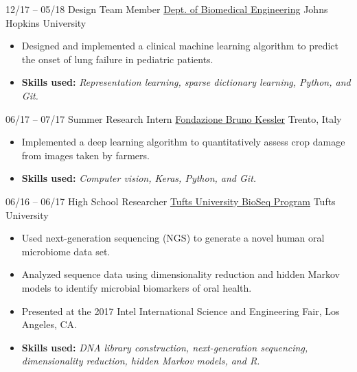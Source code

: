 \cventry
{12/17 -- 05/18}
{Design Team Member}
{\href{https://cbid.bme.jhu.edu/academics/undergraduate-studies/}{Dept. of Biomedical Engineering}}
{Johns Hopkins University}
{}
{
\begin{itemize}
    \item Designed and implemented a clinical machine learning algorithm to predict the onset of lung failure in pediatric patients.
    \item \textbf{Skills used:} \textit{Representation learning, sparse dictionary learning, Python, and Git.}
\end{itemize}{}
}

\cventry
{06/17 -- 07/17}
{Summer Research Intern}
{\href{https://webvalley.fbk.eu}{Fondazione Bruno Kessler}}
{Trento, Italy}
{}
{
\begin{itemize}
    \item Implemented a deep learning algorithm to quantitatively assess crop damage from images taken by farmers.
    \item \textbf{Skills used:} \textit{Computer vision, Keras, Python, and Git.}
\end{itemize}{}
}

\cventry
{06/16 -- 06/17}
{High School Researcher}
{\href{http://ase.tufts.edu/chemistry/walt/sepa/index.html}{Tufts University BioSeq Program}}
{Tufts University}
{}
{
\begin{itemize}
    \item Used next-generation sequencing (NGS) to generate a novel human oral microbiome data set.
    \item Analyzed sequence data using dimensionality reduction and hidden Markov models to identify microbial biomarkers of oral health.
    \item Presented at the 2017 Intel International Science and Engineering Fair, Los Angeles, CA.
    \item \textbf{Skills used:} \textit{DNA library construction, next-generation sequencing, dimensionality reduction, hidden Markov models, and R.}
\end{itemize}{}
}
